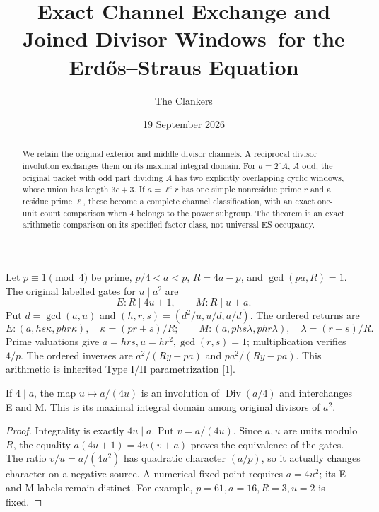 \documentclass[11pt,reqno]{amsart}
\title[Exact E/M channel windows]{Exact Channel Exchange and Joined Divisor Windows\ for the Erd\H{o}s--Straus Equation}
\author{The Clankers}\date{19 September 2026}
\begin{document}
\begin{abstract}
We retain the original exterior and middle divisor channels. A reciprocal divisor
involution exchanges them on its maximal integral domain. For $a=2^eA$, $A$ odd,
the original packet with odd part dividing $A$ has two explicitly overlapping
cyclic windows, whose union has length $3e+3$. If $a=\ell^e r$ has one simple
nonresidue prime $r$ and a residue prime $\ell$, these become a complete
channel classification, with an exact one-unit count comparison when 4 belongs
to the power subgroup. The theorem is an exact arithmetic comparison on its specified factor class,
not universal ES occupancy.
\end{abstract}\maketitle
Let $p\equiv1\pmod4$ be prime, $p/4<a<p$, $R=4a-p$, and $\gcd(pa,R)=1$.
The original labelled gates for $u\mid a^2$ are
\[
 E:R\mid4u+1,\qquad M:R\mid u+a.
\]
Put $d=\gcd(a,u)$ and $(h,r,s)=(d^2/u,u/d,a/d)$. The ordered returns are
\[
 E:(a,hs\kappa,phr\kappa),\quad\kappa=(pr+s)/R;
 \qquad M:(a,phs\lambda,phr\lambda),\quad\lambda=(r+s)/R.
\]
Prime valuations give $a=hrs,u=hr^2,\gcd(r,s)=1$; multiplication verifies $4/p$.
The ordered inverses are $a^2/(Ry-pa)$ and $pa^2/(Ry-pa)$. This arithmetic is
inherited Type I/II parametrization [1].

\begin{proposition}
If $4\mid a$, the map $u\mapsto a/(4u)$ is an involution of
$\operatorname{Div}(a/4)$ and interchanges E and M. This is its maximal integral
domain among original divisors of $a^2$.
\end{proposition}
\begin{proof}
Integrality is exactly $4u\mid a$. Put $v=a/(4u)$. Since $a,u$ are units modulo
$R$, the equality $a(4u+1)=4u(v+a)$ proves the equivalence of the gates.
The ratio $v/u=a/(4u^2)$ has quadratic character $(a/p)$, so it actually changes
character on a negative source. A numerical fixed point requires $a=4u^2$;
its E and M labels remain distinct. For example, $p=61,a=16,R=3,u=2$ is fixed.
\end{proof}
\end{document}

